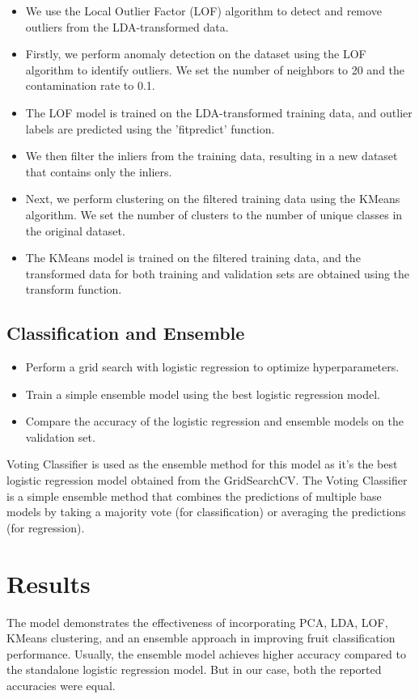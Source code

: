 \documentclass{article}
\begin{document}
\begin{itemize}
    \item We use the Local Outlier Factor (LOF) algorithm to detect and remove outliers from the LDA-transformed data.
    \item Firstly, we perform anomaly detection on the dataset using the LOF algorithm to identify outliers. We set the number of neighbors to 20 and the contamination rate to 0.1.
    \item The LOF model is trained on the LDA-transformed training data, and outlier labels are predicted using the 'fitpredict' function.
    \item We then filter the inliers from the training data, resulting in a new dataset that contains only the inliers.
    \item Next, we perform clustering on the filtered training data using the KMeans algorithm. We set the number of clusters to the number of unique classes in the original dataset.
    \item The KMeans model is trained on the filtered training data, and the transformed data for both training and validation sets are obtained using the transform function.
\end{itemize}
\subsection{Classification and Ensemble}

\begin{itemize}
    \item Perform a grid search with logistic regression to optimize hyperparameters.
    \item Train a simple ensemble model using the best logistic regression model.
    \item Compare the accuracy of the logistic regression and ensemble models on the validation set.
\end{itemize}
Voting Classifier is used as the ensemble method for this model as it's the best logistic regression model obtained from the GridSearchCV. The Voting Classifier is a simple ensemble method that combines the predictions of multiple base models by taking a majority vote (for classification) or averaging the predictions (for regression).

\section{Results}
The model demonstrates the effectiveness of incorporating PCA, LDA, LOF, KMeans clustering, and an ensemble approach in improving fruit classification performance. Usually, the ensemble model achieves higher accuracy compared to the standalone logistic regression model. But in our case, both the reported accuracies were equal.
\end{document}
